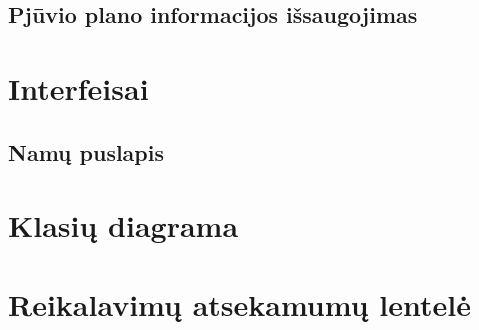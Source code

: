 \documentclass[a4paper,12pt]{article}
\begin{document}
\subsection{ Pjūvio plano informacijos išsaugojimas }



\section{Interfeisai}
\subsection{Namų puslapis}

\section{Klasių diagrama}


\section{Reikalavimų atsekamumų lentelė}
\end{document}

